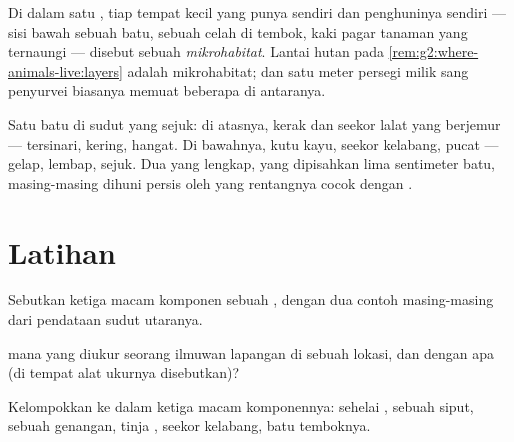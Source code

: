 \begin{definition}[Mikrohabitat]\label{def:g6:exploring-our-environment:microhabitat}
Di dalam satu , tiap tempat kecil yang punya 
sendiri dan penghuninya sendiri --- sisi bawah sebuah batu, sebuah
celah di tembok, kaki pagar tanaman yang ternaungi --- disebut sebuah
\emph{mikrohabitat}. Lantai hutan pada
\cref{rem:g2:where-animals-live:layers} adalah mikrohabitat; dan satu
meter persegi milik sang penyurvei biasanya memuat beberapa di
antaranya.
\end{definition}

\begin{example}\label{ex:g6:exploring-our-environment:stone}
Satu batu di sudut yang sejuk: di atasnya,  kerak dan seekor
lalat yang berjemur --- tersinari, kering, hangat. Di bawahnya, kutu
kayu, seekor kelabang,  pucat --- gelap, lembap, sejuk. Dua
 yang lengkap, yang dipisahkan lima sentimeter batu,
masing-masing dihuni persis oleh  yang rentangnya cocok
dengan .
\end{example}

\section{Latihan}

\begin{exercise}[$\star$]\label{exo:g6:exploring-our-environment:1}
Sebutkan ketiga macam komponen sebuah , dengan dua contoh
masing-masing dari pendataan sudut utaranya.
\end{exercise}

\begin{exercise}[$\star$]\label{exo:g6:exploring-our-environment:2}
 mana yang diukur seorang ilmuwan lapangan di sebuah lokasi,
dan dengan apa (di tempat alat ukurnya disebutkan)?
\end{exercise}

\begin{exercise}[$\star$]\label{exo:g6:exploring-our-environment:3}
Kelompokkan ke dalam ketiga macam komponennya: sehelai ,
sebuah  siput, sebuah genangan, tinja , seekor kelabang,
batu temboknya.
\end{exercise}


